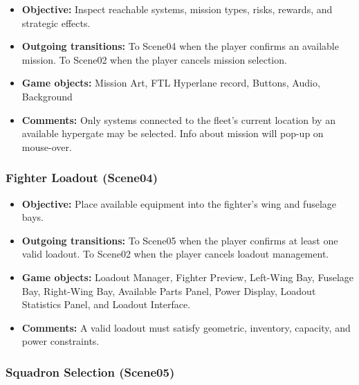\documentclass[journal]{IEEEtran}
\begin{document}
\begin{itemize}
    \item \textbf{Objective:}
    Inspect reachable systems, mission types,
    risks, rewards, and strategic effects.

    \item \textbf{Outgoing transitions:}
    To Scene04 when the player confirms an available mission.
    To Scene02 when the player cancels mission selection.

    \item \textbf{Game objects:}
    Mission Art, FTL Hyperlane record, Buttons, Audio, Background

    \item \textbf{Comments:}
    Only systems connected to the fleet's current location by an
    available hypergate may be selected. Info about mission will pop-up on mouse-over. 
\end{itemize}


\subsubsection{Fighter Loadout (Scene04)}

\begin{itemize}
    \item \textbf{Objective:}
    Place available equipment into the fighter's
    wing and fuselage bays.

    \item \textbf{Outgoing transitions:}
    To Scene05 when the player confirms at least one valid loadout.
    To Scene02 when the player cancels loadout management.

    \item \textbf{Game objects:}
    Loadout Manager, Fighter Preview, Left-Wing Bay, Fuselage Bay,
    Right-Wing Bay, Available Parts Panel, Power Display,
    Loadout Statistics Panel, and Loadout Interface.

    \item \textbf{Comments:}
    A valid loadout must satisfy geometric, inventory, capacity,
    and power constraints.
\end{itemize}


\subsubsection{Squadron Selection (Scene05)}
\end{document}
